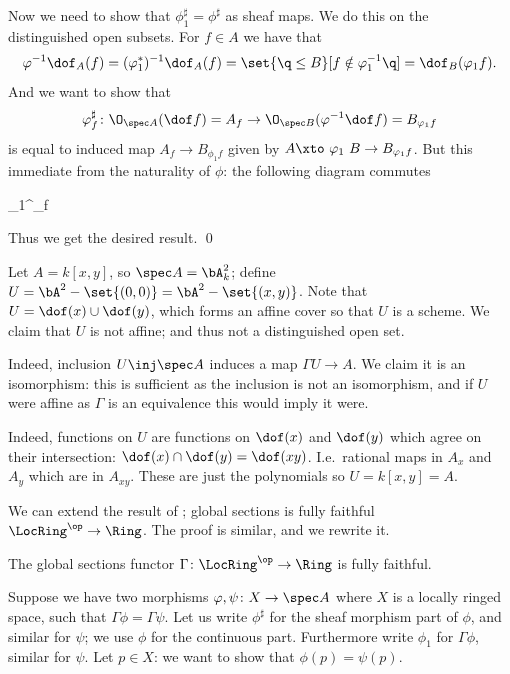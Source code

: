     Now we need to show that $\phi_1^\sharp=\phi^\sharp$ as sheaf maps.
    We do this on the distinguished open subsets.
    For $f\in A$ we have that
    $$ \phi^{-1}\dof_A(f) = (\phi_1^*)^{-1}\dof_A(f) = \set{\q\leq B}[f\notin\phi_1^{-1}\q] = \dof_B(\phi_1f) . $$
    And we want to show that
    $$ \phi^\sharp_f \colon \O_{\spec A}(\dof f) = A_f \to \O_{\spec B}(\phi^{-1}\dof f) = B_{\phi_1f} $$
    is equal to induced map $A_f\to B_{\phi_1f}$ given by $A\xtos{\phi_1}B\to B_{\phi_1f}$.
    But this immediate from the naturality of $\phi$: the following diagram commutes

        {\phi_1}{\phi^\sharp_f}{}{}

    Thus we get the desired result.
    \qed

\eproof

\bexam

    Let $A=k[x,y]$, so $\spec A=\bA^2_k$; define $U=\bA^2-\set{(0,0)}=\bA^2-\set{(x,y)}$.
    Note that $U=\dof(x)\cup\dof(y)$, which forms an affine cover so that $U$ is a scheme.
    We claim that $U$ is not affine; and thus not a distinguished open set.

    Indeed, inclusion $U\inj\spec A$ induces a map $\Gamma U\to A$.
    We claim it is an isomorphism: this is sufficient as the inclusion is not an isomorphism, and if $U$ were affine as $\Gamma$
    is an equivalence this would imply it were.

    Indeed, functions on $U$ are functions on $\dof(x)$ and $\dof(y)$ which agree on their intersection:
    $\dof(x)\cap\dof(y)=\dof(xy)$.
    I.e.\ rational maps in $A_x$ and $A_y$ which are in $A_{xy}$.
    These are just the polynomials so $U=k[x,y]=A$.

\eexam

We can extend the result of ; global sections is fully faithful $\LocRing^\op\to\Ring$.
The proof is similar, and we rewrite it.

\bthrm

    The global sections functor $\Gamma\colon\LocRing^\op\to\Ring$ is fully faithful.

\ethrm

\bproof

    Suppose we have two morphisms $\phi,\psi\colon X\to\spec A$ where $X$ is a locally ringed space, such that
    $\Gamma\phi=\Gamma\psi$.
    Let us write $\phi^\sharp$ for the sheaf morphism part of $\phi$, and similar for $\psi$; we use $\phi$ for the continuous
    part.
    Furthermore write $\phi_1$ for $\Gamma\phi$, similar for $\psi$.
    Let $p\in X$: we want to show that $\phi(p)=\psi(p)$.


